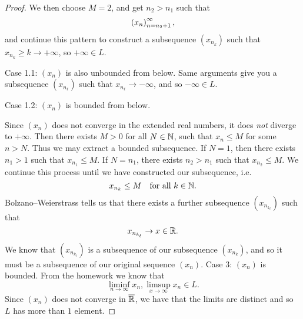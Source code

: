 \documentclass[class=article, crop=false]{standalone}
\begin{document}
\begin{itemize}
\begin{theorem}{3.22}
\begin{proof}
        We then choose $M = 2$, and get $n_2 > n_1$ such that
        \[
          \left( x_n \right)_{n = n_2 + 1}^{\infty},
        \]
        and continue this pattern to construct a subsequence $(x_{n_k})$ such that $x_{n_k}\geq k\to+\infty$, so $+\infty\in L$. \par
        Case 1.1: $(x_n)$ is also unbounded from below. Same arguments give you a subsequence $(x_{n_\ell})$ such that $x_{n_\ell}\to-\infty$, and so $-\infty\in L$. \par
        Case 1.2: $(x_n)$ is bounded from below. \par
        Since $(x_n)$ does not converge in the extended real numbers, it does \emph{not} diverge to $+\infty$. Then there exists $M > 0$ for all $N\in\mathbb{N}$, such that $x_n\leq M$ for some $n > N$. Thus we may extract a bounded subsequence. If $N = 1$, then there exists $n_1 > 1$ such that $x_{n_1} \leq M$. If $N = n_1$, there exists $n_2 > n_1$ such that $x_{n_2}\leq M$. We continue this process until we have constructed our subsequence, i.e.
        \[
          x_{n_k}\leq M\quad \text{for all }k\in \mathbb{N}.
        \]
        Bolzano--Weierstrass tells us that there exists a further subsequence $(x_{n_{k_\ell}})$ such that
        \[
          x_{n_{k_\ell}}\to x\in\mathbb{R}.
        \]
        We know that $(x_{n_{k_\ell}})$ is a subsequence of our subsequence $(x_{n_k})$, and so it must be a subsequence of our original sequence $(x_n)$.
        Case 3: $(x_n)$ is bounded. From the homework we know that
        \[
          \liminf_{n\to\infty} x_n, \limsup_{x\to\infty}x_n\in L.
        \]
        Since $(x_n)$ does not converge in $\overline{\mathbb{R}}$, we have that the limits are distinct and so $L$ has more than $1$ element.
      \end{proof}
    \end{theorem}
  \end{itemize}
\end{document}
